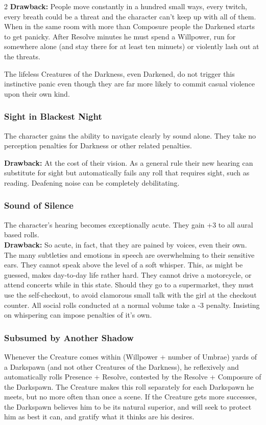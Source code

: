 \begin{multicols}{2}
\noindent \textbf{Drawback:} People move constantly in a hundred small ways, every twitch, every breath could be a threat and the character can't keep up with all of them. When in the same room with more than Composure people the Darkened starts to get panicky. After Resolve minutes he must spend a Willpower, run for somewhere alone (and stay there for at least ten minuets) or violently lash out at the threats. 

The lifeless Creatures of the Darkness, even Darkened, do not trigger this instinctive panic even though they are far more likely to commit casual violence upon their own kind. 

\subsubsection*{Sight in Blackest Night}
The character gains the ability to navigate clearly by sound alone. They take no perception penalties for Darkness or other related penalties. 

\noindent \textbf{Drawback:} At the cost of their vision. As a general rule their new hearing can substitute for sight but automatically fails any roll that requires sight, such as reading. Deafening noise can be completely debilitating. 

\subsubsection*{Sound of Silence}
The character’s hearing becomes exceptionally acute. They gain +3 to all aural based rolls. \\

\noindent \textbf{Drawback:} So acute, in fact, that they are pained by voices, even their own. The many subtleties and emotions in speech are overwhelming to their sensitive ears. They cannot speak above the level of a soft whisper. This, as might be guessed, makes day-to-day life rather hard. They cannot drive a motorcycle, or attend concerts while in this state. Should they go to a supermarket, they must use the self-checkout, to avoid clamorous small talk with the girl at the checkout counter. All social rolls conducted at a normal volume take a -3 penalty. Insisting on whispering can impose penalties of it's own. 

\subsubsection*{Subsumed by Another Shadow}
Whenever the Creature comes within (Willpower + number of Umbrae) yards of a Darkspawn (and not other Creatures of the Darkness), he reflexively and automatically rolls Presence + Resolve, contested by the Resolve + Composure of the Darkspawn. The Creature makes this roll separately for each Darkspawn he meets, but no more often than once a scene. If the Creature gets more successes, the Darkspawn believes him to be its natural superior, and will seek to protect him as best it can, and gratify what it thinks are his desires. 


\end{multicols}
